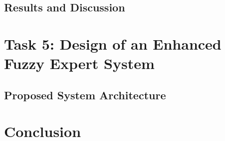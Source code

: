 \documentclass{article}
\begin{document}

\subsection{Results and Discussion}


\section{Task 5: Design of an Enhanced Fuzzy Expert System}


\subsection{Proposed System Architecture}


\section{Conclusion}



\printbibliography
\end{document}
